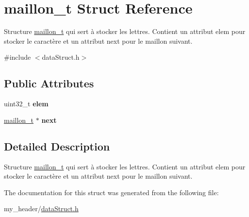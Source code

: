 \hypertarget{structmaillon__t}{}\section{maillon\+\_\+t Struct Reference}
\label{structmaillon__t}


Structure \mbox{\hyperlink{structmaillon__t}{maillon\+\_\+t}} qui sert à stocker les lettres. Contient un attribut elem pour stocker le caractère et un attribut next pour le maillon suivant.  




{\ttfamily \#include $<$data\+Struct.\+h$>$}

\subsection*{Public Attributes}
\begin{DoxyCompactItemize}
\item 
\mbox{\label{structmaillon__t_a44950a06c05c34592ee9e7c13e43d61e}} 
uint32\+\_\+t {\bfseries elem}
\item 
\mbox{\label{structmaillon__t_aad70af27fceb3a54988d7a98c30a662f}} 
\mbox{\hyperlink{structmaillon__t}{maillon\+\_\+t}} $\ast$ {\bfseries next}
\end{DoxyCompactItemize}


\subsection{Detailed Description}
Structure \mbox{\hyperlink{structmaillon__t}{maillon\+\_\+t}} qui sert à stocker les lettres. Contient un attribut elem pour stocker le caractère et un attribut next pour le maillon suivant. 

The documentation for this struct was generated from the following file\+:\begin{DoxyCompactItemize}
\item 
my\+\_\+header/\mbox{\hyperlink{dataStruct_8h}{data\+Struct.\+h}}\end{DoxyCompactItemize}
